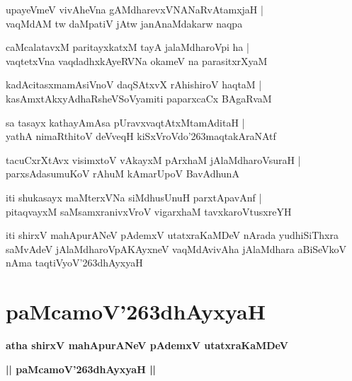 \documentclass[twoside,12pt,openright]{book}
\def\S{\char'263}
\newcounter{shloka}[chapter]
\begin{document}
\begin{shloka}%
upayeVmeV vivAheVna gAMdharevxVNANaRvAtamxjaH |\\
vaqMdAM tw daMpatiV jAtw janAnaMdakarw naqpa
\end{shloka}

\begin{shloka}%
caMcalatavxM paritayxkatxM tayA jalaMdharoVpi ha |\\
vaqtetxVna vaqdadhxkAyeRVNa okameV na parasitxrXyaM 
\end{shloka}

\begin{shloka}%
kadAcitasxmamAsiVnoV daqSAtxvX rAhishiroV haqtaM |\\
kasAmxtAkxyAdhaRsheVSoVyamiti paparxcaCx BAgaRvaM 
\end{shloka}

\begin{shloka}%
sa tasayx kathayAmAsa pUravxvaqtAtxMtamAditaH |\\
yathA nimaRthitoV deVveqH kiSxVroVdo\S maqtakAraNAtf 
\end{shloka}

\begin{shloka}%
tacuCxrXtAvx visimxtoV vAkayxM pArxhaM jAlaMdharoVsuraH |\\
parxsAdasumuKoV rAhuM kAmarUpoV BavAdhunA 
\end{shloka}

\begin{shloka}%
iti shukasayx maMterxVNa siMdhusUnuH parxtApavAnf |\\
pitaqvayxM saMsamxranivxVroV vigarxhaM tavxkaroVtusxreYH
\end{shloka}

\begin{center}
iti shirxV mahApurANeV pAdemxV utatxraKaMDeV nArada yudhiSiThxra saMvAdeV jAlaMdharoVpAKAyxneV vaqMdAvivAha jAlaMdhara aBiSeVkoV nAma taqtiVyoV\S dhAyxyaH 
\end{center}

\chapter{paMcamoV\S dhAyxyaH}

\begin{center}
{\LARGE\bfseries atha shirxV mahApurANeV pAdemxV utatxraKaMDeV} 
\end{center}

\begin{center}
{\LARGE\bfseries  || paMcamoV\S dhAyxyaH ||}
\end{center}
\end{document}
